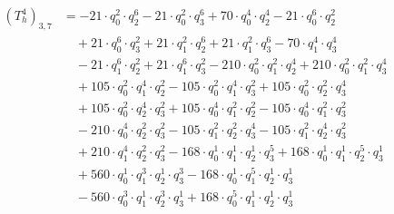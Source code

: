 \begin{align*}(T_{h}^4)_{3,7}&=-21\cdot q_0^{2}\cdot q_2^{6}-21\cdot q_0^{2}\cdot q_3^{6}+70\cdot q_0^{4}\cdot q_2^{4}-21\cdot q_0^{6}\cdot q_2^{2}\\
&\quad +21\cdot q_0^{6}\cdot q_3^{2}+21\cdot q_1^{2}\cdot q_2^{6}+21\cdot q_1^{2}\cdot q_3^{6}-70\cdot q_1^{4}\cdot q_3^{4}\\
&\quad -21\cdot q_1^{6}\cdot q_2^{2}+21\cdot q_1^{6}\cdot q_3^{2}-210\cdot q_0^{2}\cdot q_1^{2}\cdot q_2^{4}+210\cdot q_0^{2}\cdot q_1^{2}\cdot q_3^{4}\\
&\quad +105\cdot q_0^{2}\cdot q_1^{4}\cdot q_2^{2}-105\cdot q_0^{2}\cdot q_1^{4}\cdot q_3^{2}+105\cdot q_0^{2}\cdot q_2^{2}\cdot q_3^{4}\\
&\quad +105\cdot q_0^{2}\cdot q_2^{4}\cdot q_3^{2}+105\cdot q_0^{4}\cdot q_1^{2}\cdot q_2^{2}-105\cdot q_0^{4}\cdot q_1^{2}\cdot q_3^{2}\\
&\quad -210\cdot q_0^{4}\cdot q_2^{2}\cdot q_3^{2}-105\cdot q_1^{2}\cdot q_2^{2}\cdot q_3^{4}-105\cdot q_1^{2}\cdot q_2^{4}\cdot q_3^{2}\\
&\quad +210\cdot q_1^{4}\cdot q_2^{2}\cdot q_3^{2}-168\cdot q_0^{1}\cdot q_1^{1}\cdot q_2^{1}\cdot q_3^{5}+168\cdot q_0^{1}\cdot q_1^{1}\cdot q_2^{5}\cdot q_3^{1}\\
&\quad +560\cdot q_0^{1}\cdot q_1^{3}\cdot q_2^{1}\cdot q_3^{3}-168\cdot q_0^{1}\cdot q_1^{5}\cdot q_2^{1}\cdot q_3^{1}\\
&\quad -560\cdot q_0^{3}\cdot q_1^{1}\cdot q_2^{3}\cdot q_3^{1}+168\cdot q_0^{5}\cdot q_1^{1}\cdot q_2^{1}\cdot q_3^{1}\end{align*}

